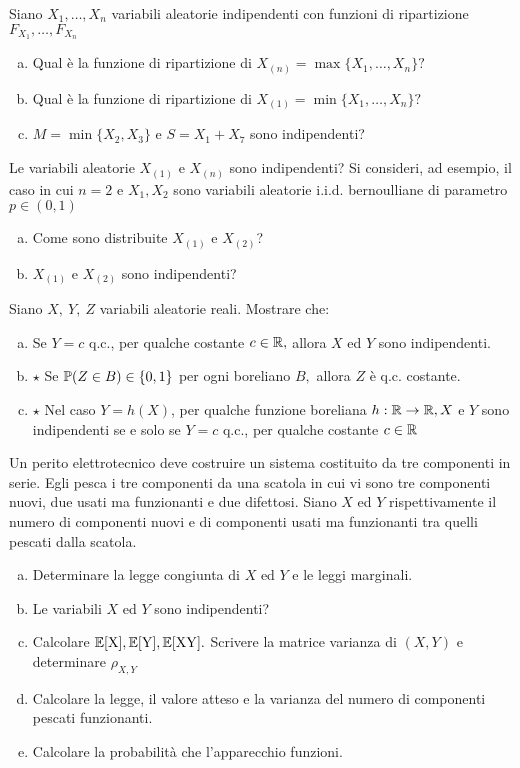 \Esercizio{}

Siano $X_{1} ,\dots ,X_{n}$ variabili aleatorie indipendenti con funzioni di ripartizione $F_{X_{1}} ,\dots ,F_{X_{n}}$
\begin{enumerate}[a)]
	\item Qual è la funzione di ripartizione di $X_{(n)} =\max\{X_{1} ,\dots ,X_{n}\} ?$
	\item Qual è la funzione di ripartizione di $X_{(1)} =\min\{X_{1} ,\dots ,X_{n}\} ?$
	\item $M=\min\{X_{2} ,X_{3}\}$ e $S=X_{1} +X_{7}$ sono indipendenti?
\end{enumerate}

Le variabili aleatorie $X_{(1)}$ e $X_{(n)}$ sono indipendenti? Si consideri, ad esempio, il caso in cui $n=2$ e $X_{1} ,X_{2}$ sono variabili aleatorie i.i.d. bernoulliane di parametro $p\in (0,1)$

\begin{enumerate}[a),resume]
	\item Come sono distribuite $X_{(1)}$ e $X_{(2)}$?
	\item $X_{(1)}$ e $X_{(2)}$ sono indipendenti?
\end{enumerate}

\Esercizio{}

Siano $X,\ Y,\ Z$ variabili aleatorie reali. Mostrare che:
\begin{enumerate}[a)]
	\item Se $Y=c$ q.c., per qualche costante $c\in \mathbb{R} ,$ allora $X$ ed $Y$ sono indipendenti.
	\item $\star$ Se $\mathbb{P} (Z\in B)\in \{0,1\}$ per ogni boreliano $B,$ allora $Z$ è q.c. costante.
	\item $\star$ Nel caso $Y=h(X)$, per qualche funzione boreliana $h:\mathbb{R}\rightarrow \mathbb{R} ,X$ e $Y$ sono indipendenti se e solo se $Y=c$ q.c., per qualche costante $c\in \mathbb{R}$
\end{enumerate}

\Esercizio{}

Un perito elettrotecnico deve costruire un sistema costituito da tre componenti in serie. Egli pesca i tre componenti da una scatola in cui vi sono tre componenti nuovi, due usati ma funzionanti e due difettosi. Siano $X$ ed $Y$ rispettivamente il numero di componenti nuovi e di componenti usati ma funzionanti tra quelli pescati dalla scatola.

\begin{enumerate}[a)]
	\item Determinare la legge congiunta di $X$ ed $Y$ e le leggi marginali.
	\item Le variabili $X$ ed $Y$ sono indipendenti?
	\item Calcolare $\mathbb{E}[\mathrm{X}],\mathbb{E}[\mathrm{Y}],\mathbb{E}[\mathrm{XY}].$ Scrivere la matrice varianza di $(X,Y)$ e determinare $\rho_{X,Y}$
	\item Calcolare la legge, il valore atteso e la varianza del numero di componenti pescati funzionanti.
	\item Calcolare la probabilità che l'apparecchio funzioni.
\end{enumerate}


